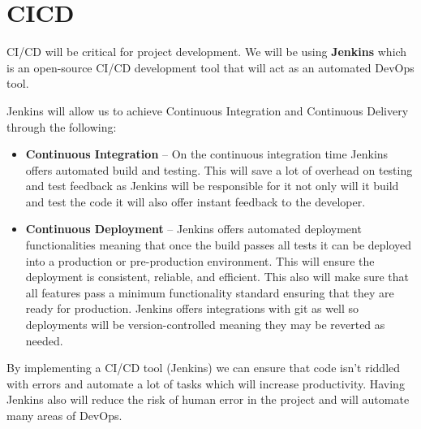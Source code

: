 \documentclass{article}
\begin{document}
\section{CICD}



CI/CD will be critical for project development. We will be using \textbf{Jenkins} which is an open-source CI/CD development tool that will act as an automated DevOps tool.

Jenkins will allow us to achieve Continuous Integration and Continuous Delivery through the following:
\begin{itemize}
  \item \textbf{Continuous Integration} -- On the continuous integration time Jenkins offers automated build and testing. This will save a lot of overhead on testing and test feedback as Jenkins will be responsible for it not only will it build and test the code it will also offer instant feedback to the developer.
  \item \textbf{Continuous Deployment} -- Jenkins offers automated deployment functionalities meaning that once the build passes all tests it can be deployed into a production or pre-production environment. This will ensure the deployment is consistent, reliable, and efficient. This also will make sure that all features pass a minimum functionality standard ensuring that they are ready for production. Jenkins offers integrations with git as well so deployments will be version-controlled meaning they may be reverted as needed.
\end{itemize}

By implementing a CI/CD tool (Jenkins) we can ensure that code isn't riddled with errors and automate a lot of tasks which will increase productivity. Having Jenkins also will reduce the risk of human error in the project and will automate many areas of DevOps.
\end{document}
